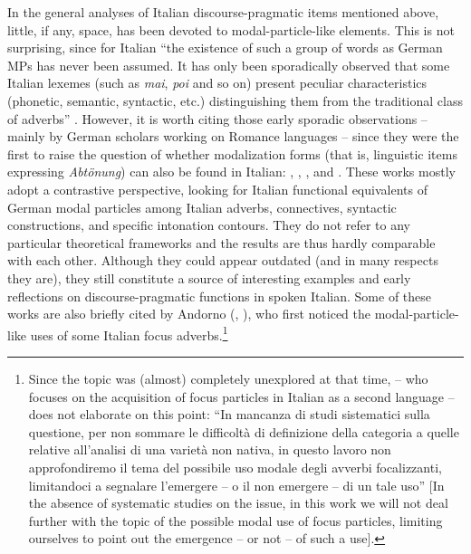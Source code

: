 In the general analyses of Italian discourse-pragmatic items mentioned above, little, if any, space, has been devoted to modal-particle-like elements. This is not surprising, since for Italian “the existence of such a group of words as German MPs has never been assumed. It has only been sporadically observed that some Italian lexemes (such as \textit{mai}, \textit{poi} and so on) present peculiar characteristics (phonetic, semantic, syntactic, etc.) distinguishing them from the traditional class of adverbs” \citep[92]{Coniglio2008}. However, it is worth citing those early sporadic observations – mainly by German scholars working on Romance languages – since they were the first to raise the question of whether modalization forms (that is, linguistic items expressing \textit{Abtönung}) can also be found in Italian: \citet{Stammerjohann1980}, \citet{Held1985,Held1988}, \citet{Burkhardt1985}, \citet{Radtke1985} and \citet{Masi1996}. These works mostly adopt a contrastive perspective, looking for Italian functional equivalents of German modal particles among Italian adverbs, connectives, syntactic constructions, and specific intonation contours. They do not refer to any particular theoretical frameworks and the results are thus hardly comparable with each other. Although they could appear outdated (and in many respects they are), they still constitute a source of interesting examples and early reflections on discourse-pragmatic functions in spoken Italian. Some of these works are also briefly cited by Andorno (\citeyear{Andorno2000}, \citeyear[180–181]{Andorno2003}), who first noticed the modal-particle-like uses of some Italian focus adverbs.\footnote{Since the topic was (almost) completely unexplored at that time, \citet[54]{Andorno2000} – who focuses on the acquisition of focus particles in Italian as a second language – does not elaborate on this point: “In mancanza di studi sistematici sulla questione, per non sommare le difficoltà di definizione della categoria a quelle relative all’analisi di una varietà non nativa, in questo lavoro non approfondiremo il tema del possibile uso modale degli avverbi focalizzanti, limitandoci a segnalare l’emergere – o il non emergere – di un tale uso” [In the absence of systematic studies on the issue, in this work we will not deal further with the topic of the possible modal use of focus particles, limiting ourselves to point out the emergence – or not – of such a use].}

